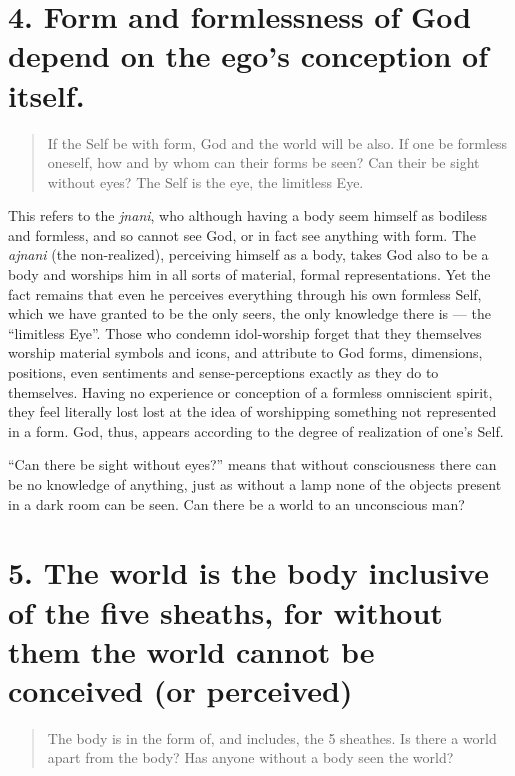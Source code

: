 \documentclass[12pt]{report}
\begin{document}
\section{4. Form and formlessness of God depend on the ego's
  conception of itself.}

\begin{quote}
  If the Self be with form, God and the world will be also. If one be
  formless oneself, how and by whom can their forms be seen? Can their
  be sight without eyes? The Self is the eye, the limitless Eye.
\end{quote}


This refers to the \emph{jnani}, who although having a body seem
himself as bodiless and formless, and so cannot see God, or in fact
see anything with form. The \emph{ajnani} (the non-realized),
perceiving himself as a body, takes God also to be a body and worships
him in all sorts of material, formal representations. Yet the fact
remains that even he perceives everything through his own formless
Self, which we have granted to be the only seers, the only knowledge
there is --- the ``limitless Eye''. Those who condemn idol-worship
forget that they themselves worship material symbols and icons, and
attribute to God forms, dimensions, positions, even sentiments and
sense-perceptions exactly as they do to themselves. Having no
experience or conception of a formless omniscient spirit, they feel
literally lost lost at the idea of worshipping something not
represented in a form. God, thus, appears according to the degree of
realization of one's Self.

``Can there be sight without eyes?'' means that without consciousness
there can be no knowledge of anything, just as without a lamp none of
the objects present in a dark room can be seen. Can there be a world
to an unconscious man?

\section{5. The world is the body inclusive of the five sheaths, for
  without them the world cannot be conceived (or perceived)}

\begin{quote}
  The body is in the form of, and includes, the 5 sheathes. Is there a
  world apart from the body? Has anyone without a body seen the world?
\end{quote}
\end{document}
